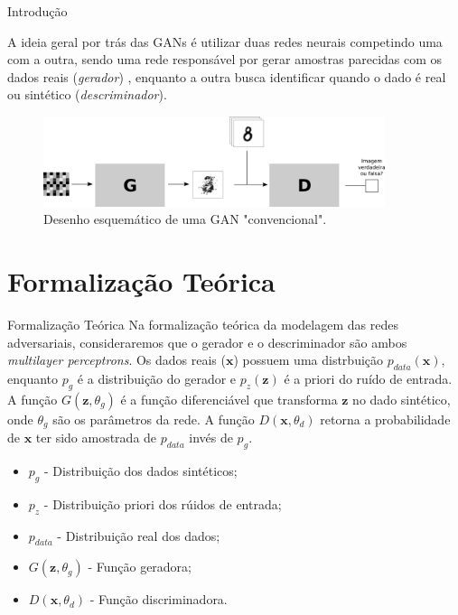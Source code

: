 \documentclass[10pt]{beamer}
\begin{document}
\begin{frame}[fragile]{Introdução}

	A ideia geral por trás das GANs é utilizar duas redes neurais
	competindo uma com a outra, sendo uma rede responsável por
	gerar amostras parecidas com os dados reais (\textit{gerador})
	, enquanto a outra
	busca identificar quando o dado é real ou sintético
	(\textit{descriminador}).

    \begin{figure}[H]
        \centering
        \includegraphics[width=10cm]{images/gan_scheme.png}
        \caption{Desenho esquemático de uma GAN "convencional".}
    \end{figure}

\end{frame}

\AtBeginSection{}
\section[Teoria]{Formalização Teórica}
\begin{frame}[fragile]{Formalização Teórica}
	Na formalização teórica da modelagem das 
	redes adversariais, consideraremos que
	o gerador e o descriminador são ambos \textit{multilayer perceptrons}.
	Os dados reais ($\bm x$) possuem uma distrbuição
	$p_{data}(\bm x)$, enquanto $p_g$ é a distribuição do gerador e
	$p_z(\bm z)$ é a priori do ruído de entrada. A função
	$G(\bm z, \theta_g)$ é a função diferenciável que transforma $\bm z$ no
	dado sintético, onde $\theta_g$ são os parâmetros da rede.
	A função $D(\bm x, \theta_d)$ retorna a probabilidade de $\bm x$ ter
	sido amostrada de $p_{data}$ invés de $p_g$.
	\begin{itemize}
		\item $p_g$ - Distribuição dos dados sintéticos;
		\item $p_z$ - Distribuição priori dos rúidos de entrada;
		\item $p_{data}$ - Distribuição real dos dados;
		\item $G(\bm z,\theta_g)$ - Função geradora;
		\item $D(\bm x,\theta_d)$ - Função discriminadora.
	\end{itemize}
\end{frame}
\end{document}
